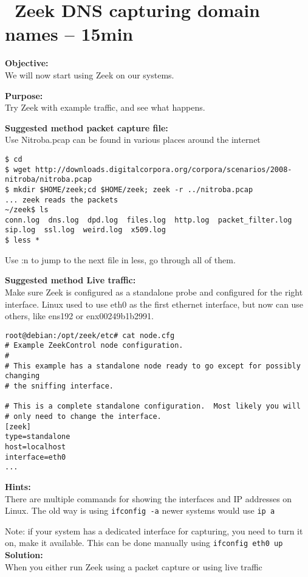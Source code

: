 \documentclass[a4paper,11pt,notitlepage]{report}
\begin{document}
\chapter{\faExclamationTriangle\ Zeek DNS capturing domain names -- 15min}
\label{ex:zeekdnsbasic}


{\bf Objective:} \\
We will now start using Zeek on our systems.


{\bf Purpose:}\\
Try Zeek with example traffic, and see what happens.


{\bf Suggested method packet capture file:}\\
Use Nitroba.pcap can be found in various places around the internet

\begin{verbatim}
$ cd
$ wget http://downloads.digitalcorpora.org/corpora/scenarios/2008-nitroba/nitroba.pcap
$ mkdir $HOME/zeek;cd $HOME/zeek; zeek -r ../nitroba.pcap
... zeek reads the packets
~/zeek$ ls
conn.log  dns.log  dpd.log  files.log  http.log  packet_filter.log
sip.log  ssl.log  weird.log  x509.log
$ less *
\end{verbatim}

Use :n to jump to the next file in less, go through all of them.

{\bf Suggested method Live traffic:}\\
Make sure Zeek is configured as a standalone probe and configured for the right interface. Linux used to use eth0 as the first ethernet interface, but now can use others, like ens192 or enx00249b1b2991.

\begin{verbatim}
root@debian:/opt/zeek/etc# cat node.cfg
# Example ZeekControl node configuration.
#
# This example has a standalone node ready to go except for possibly changing
# the sniffing interface.

# This is a complete standalone configuration.  Most likely you will
# only need to change the interface.
[zeek]
type=standalone
host=localhost
interface=eth0
...
\end{verbatim}


{\bf Hints:}\\
There are multiple commands for showing the interfaces and IP addresses on Linux. The old way is using \verb+ifconfig -a+ newer systems would use \verb+ip a+

Note: if your system has a dedicated interface for capturing, you need to turn it on, make it available. This can be done manually using \verb+ifconfig eth0 up+
{\bf Solution:}\\
When you either run Zeek using a packet capture or using live traffic
\end{document}
